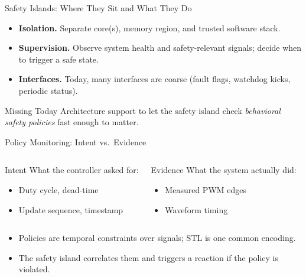 \documentclass[aspectratio=169,12pt]{beamer}
\newcommand{\SafetyIsland}{safety island\xspace}
\newcommand{\STL}{STL\xspace}
\begin{document}
\begin{frame}{Safety Islands: Where They Sit and What They Do}
\begin{itemize}
\item \textbf{Isolation.} Separate core(s), memory region, and trusted software stack.
\item \textbf{Supervision.} Observe system health and safety-relevant signals; decide when to trigger a safe state.
\item \textbf{Interfaces.} Today, many interfaces are coarse (fault flags, watchdog kicks, periodic status).
\end{itemize}

\vspace{0.6em}
\begin{alertblock}{Missing Today}
Architecture support to let the \SafetyIsland check \emph{behavioral safety policies} fast enough to matter.
\end{alertblock}
\end{frame}

\begin{frame}{Policy Monitoring: Intent vs.\ Evidence}
\begin{columns}[T,onlytextwidth]
  \begin{block}{Intent}
  What the controller asked for:
  \begin{itemize}
  \item Duty cycle, dead-time
  \item Update sequence, timestamp
  \end{itemize}
  \end{block}

  \begin{alertblock}{Evidence}
  What the system actually did:
  \begin{itemize}
  \item Measured PWM edges
  \item Waveform timing
  \end{itemize}
  \end{alertblock}
\end{columns}

\vspace{0.6em}
\begin{itemize}
\item Policies are temporal constraints over signals; \STL is one common encoding.
\item The \SafetyIsland correlates them and triggers a reaction if the policy is violated.
\end{itemize}
\end{frame}
\end{document}
